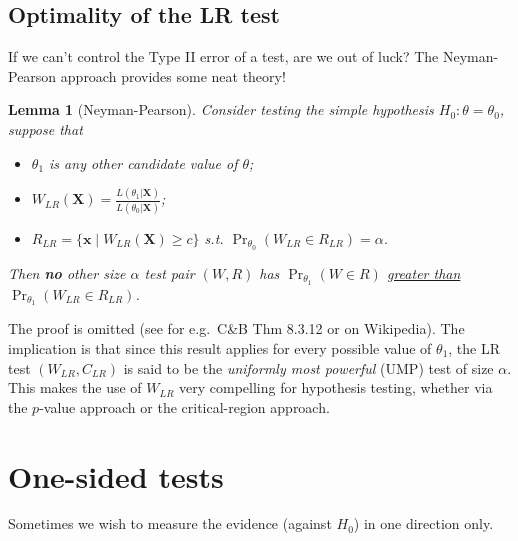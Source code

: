 \documentclass[
]{book}
\providecommand{\tightlist}{%
  \setlength{\itemsep}{0pt}\setlength{\parskip}{0pt}}
\newcommand{\bx}{{\boldsymbol x}}
\newcommand{\bX}{{\boldsymbol X}}
\newtheorem{lemma}{Lemma}[chapter]
\theoremstyle{definition}
\theoremstyle{definition}
\theoremstyle{definition}
\theoremstyle{definition}
\theoremstyle{remark}
\begin{document}
\hypertarget{optimality-of-the-lr-test}{%
\subsection{Optimality of the LR test}\label{optimality-of-the-lr-test}}

If we can't control the Type II error of a test, are we out of luck?
The Neyman-Pearson approach provides some neat theory!

\begin{lemma}[Neyman-Pearson]
Consider testing the simple hypothesis \(H_0:\theta=\theta_0\), suppose that

\begin{itemize}
\tightlist
\item
  \(\theta_1\) is any other candidate value of \(\theta\);
\item
  \(W_{LR}(\bX) = \frac{L(\theta_1|\bX)}{L(\theta_0|\bX)}\);
\item
  \(R_{LR} = \{\bx \mid W_{LR}(\bX) \geq c \}\) s.t. \(\Pr_{\theta_0}(W_{LR} \in R_{LR})=\alpha\).
\end{itemize}

Then \textbf{no} other size \(\alpha\) test pair \((W,R)\) has \(\Pr_{\theta_1}(W \in R)\) \uline{greater than} \(\Pr_{\theta_1}(W_{LR} \in R_{LR})\).
\end{lemma}

The proof is omitted (see for e.g.~C\&B Thm 8.3.12 or on Wikipedia).
The implication is that since this result applies for every possible value of \(\theta_1\), the LR test \((W_{LR}, C_{LR})\) is said to be the \emph{uniformly most powerful} (UMP) test of size \(\alpha\). This makes the use of \(W_{LR}\) very compelling for hypothesis testing, whether via the \(p\)-value approach or the critical-region approach.

\hypertarget{one-sided-tests}{%
\section{One-sided tests}\label{one-sided-tests}}

Sometimes we wish to measure the evidence (against \(H_0\)) in one direction only.
\end{document}
